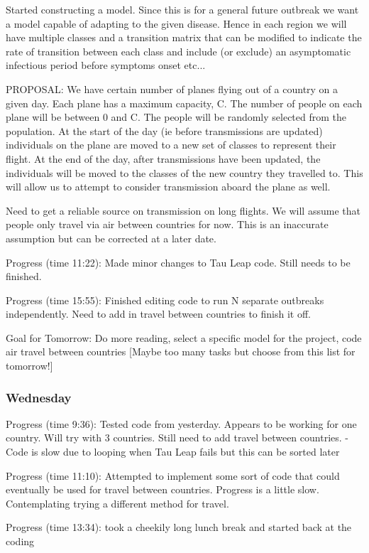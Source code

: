 \documentclass[a4paper,11pt]{article}
\theoremstyle{plain}
\theoremstyle{definition}
\begin{document}
Started constructing a model. Since this is for a general future outbreak we want a model capable of adapting to the given disease. Hence in each region we will have multiple classes and a transition matrix that can be modified to indicate the rate of transition between each class and include (or exclude) an asymptomatic infectious period before symptoms onset etc...

PROPOSAL: We have certain number of planes flying out of a country on a given day. Each plane has a maximum capacity, C. The number of people on each plane will be between 0 and C. The people will be randomly selected from the population. At the start of the day (ie before transmissions are updated) individuals on the plane are moved to a new set of classes to represent their flight. At the end of the day, after transmissions have been updated, the individuals will be moved to the classes of the new country they travelled to. This will allow us to attempt to consider transmission aboard the plane as well.

Need to get a reliable source on transmission on long flights. We will assume that people only travel via air between countries for now. This is an inaccurate assumption but can be corrected at a later date.

Progress (time 11:22): Made minor changes to Tau Leap code. Still needs to be finished.

Progress (time 15:55): Finished editing code to run N separate outbreaks independently. Need to add in travel between countries to finish it off.

Goal for Tomorrow: Do more reading, select a specific model for the project, code air travel between countries [Maybe too many tasks but choose from this list for tomorrow!]

\subsubsection{Wednesday}

Progress (time 9:36): Tested code from yesterday. Appears to be working for one country. Will try with 3 countries. Still need to add travel between countries. - Code is slow due to looping when Tau Leap fails but this can be sorted later

Progress (time 11:10): Attempted to implement some sort of code that could eventually be used for travel between countries. Progress is a little slow. Contemplating trying a different method for travel.

Progress (time 13:34): took a cheekily long lunch break and started back at the coding
\end{document}

